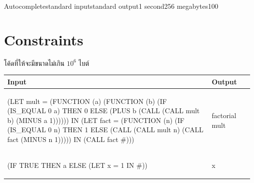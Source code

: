 \documentclass[11pt,a4paper]{article}
\begin{document}
\begin{problem}{Autocomplete}{standard input}{standard output}{1 second}{256 megabytes}{100}
\section*{Constraints}

  โค้ดที่ให้จะมีขนาดไม่เกิน $10^6$ ไบต์

\Examples

  \begin{tabular}{|M{12cm}|M{3.5cm}|N}
    \hline
    \textbf{Input} & \textbf{Output} & \\[5pt]
    \hline \hline


    {\begin{codetumso}
(LET mult = (FUNCTION (a)
              (FUNCTION (b)
                (IF (IS_EQUAL 0 a)
                 THEN 0
                 ELSE (PLUS b (CALL (CALL mult b)
                                    (MINUS a 1)))))) IN
  (LET fact = (FUNCTION (n)
                (IF (IS_EQUAL 0 n)
                 THEN 1
                 ELSE (CALL (CALL mult n)
                            (CALL fact
                                  (MINUS n 1))))) IN
    (CALL fact #)))
    \end{codetumso}} & {\begin{codetumso}
factorial
mult
    \end{codetumso}}
    \\ \hline


    {\begin{codetumso}
(IF TRUE THEN a ELSE (LET x = 1 IN #))
    \end{codetumso}} & {\begin{codetumso}
x
    \end{codetumso}} \\ \hline
\end{tabular}

\end{problem}
\end{document}

